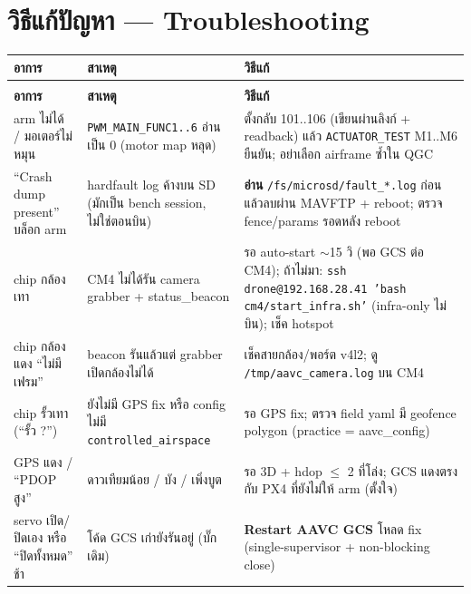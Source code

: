 \documentclass[11pt,a4paper]{article}
\newcommand{\code}[1]{\texttt{\small #1}}
\begin{document}
\section{วิธีแก้ปัญหา — Troubleshooting}\label{sec:trouble}
\begin{longtable}{@{}>{\raggedright\arraybackslash}p{4.6cm} >{\raggedright\arraybackslash}p{4.6cm} >{\raggedright\arraybackslash}p{6.8cm}@{}}
\toprule
\textbf{อาการ} & \textbf{สาเหตุ} & \textbf{วิธีแก้} \\
\midrule
\endfirsthead
\multicolumn{3}{@{}l}{\small\color{gray}(ต่อ) วิธีแก้ปัญหา}\\
\toprule
\textbf{อาการ} & \textbf{สาเหตุ} & \textbf{วิธีแก้} \\
\midrule
\endhead
\bottomrule
\endfoot

arm ไม่ได้ / มอเตอร์ไม่หมุน &
\code{PWM_MAIN_FUNC1..6} อ่านเป็น 0 (motor map หลุด) &
ตั้งกลับ 101..106 (เขียนผ่านลิงก์ + readback) แล้ว \code{ACTUATOR_TEST} M1..M6 ยืนยัน; อย่าเลือก airframe ซ้ำใน QGC \\

``Crash dump present'' บล็อก arm &
hardfault log ค้างบน SD (มักเป็น bench session, ไม่ใช่ตอนบิน) &
\textbf{อ่าน} \code{/fs/microsd/fault_*.log} ก่อน แล้วลบผ่าน MAVFTP + reboot; ตรวจ fence/params รอดหลัง reboot \\

chip กล้องเทา &
CM4 ไม่ได้รัน camera grabber + status\_beacon &
รอ auto-start $\sim$15 วิ (พอ GCS ต่อ CM4); ถ้าไม่มา: \code{ssh drone@192.168.28.41 'bash cm4/start_infra.sh'} (infra-only ไม่บิน); เช็ค hotspot \\

chip กล้อง \textcolor{stopred}{แดง} ``ไม่มีเฟรม'' &
beacon รันแล้วแต่ grabber เปิดกล้องไม่ได้ &
เช็คสายกล้อง/พอร์ต v4l2; ดู \code{/tmp/aavc_camera.log} บน CM4 \\

chip รั้วเทา (``รั้ว ?'') &
ยังไม่มี GPS fix หรือ config ไม่มี \code{controlled_airspace} &
รอ GPS fix; ตรวจ field yaml มี geofence polygon (practice = aavc\_config) \\

GPS แดง / ``PDOP สูง'' &
ดาวเทียมน้อย / บัง / เพิ่งบูต &
รอ 3D + hdop $\leq$ 2 ที่โล่ง; GCS แดงตรงกับ PX4 ที่ยังไม่ให้ arm (ตั้งใจ) \\

servo เปิด/ปิดเอง หรือ ``ปิดทั้งหมด'' ช้า &
โค้ด GCS เก่ายังรันอยู่ (บั๊กเดิม) &
\textbf{Restart AAVC GCS} โหลด fix (single-supervisor + non-blocking close) \\


\end{longtable}
\end{document}
